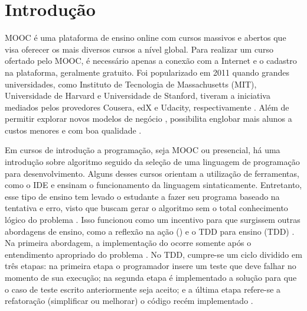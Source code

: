 \chapter{Introdução}

	\ac{MOOC} é uma plataforma de ensino online
	com cursos massivos e abertos que visa oferecer os mais diversos cursos a nível
	global. Para realizar um curso ofertado pelo \acs{MOOC}, é necessário apenas a conexão
	com a Internet e o cadastro na plataforma, geralmente gratuito. Foi popularizado
	em 2011 quando grandes universidades, como Instituto de Tecnologia de
	Massachusetts (MIT), Universidade de Harvard e Universidade de Stanford, tiveram
	a iniciativa mediados pelos provedores Cousera, edX e Udacity, respectivamente
	\cite{Mehlenbacher:2012}. Além de permitir explorar novos modelos de negócio
	\cite{dellarocas2013money}, possibilita englobar mais alunos a custos menores
	e com boa qualidade \cite{schmidt2013producing}.
	
	Em cursos de introdução a programação, seja \acs{MOOC} ou presencial, há uma introdução
	sobre algoritmo seguido da seleção de uma linguagem de programação para
	desenvolvimento. Alguns desses cursos orientam a utilização de ferramentas, como
	o \acs{IDE} e ensinam o funcionamento da linguagem sintaticamente.
	Entretanto, esse tipo de ensino tem levado o estudante a fazer seu programa baseado
	na tentativa e erro, visto que buscam gerar o algoritmo sem o total conhecimento
	lógico do problema \cite{edwards2003}. Isso funcionou como um incentivo para que
	surgissem outras abordagens de ensino, como a reflexão na ação () e o \acf{TDD} para ensino (\acs{TDD}) \cite{camara_graciottoSilva2016}. Na primeira abordagem, a
	implementação do  ocorre somente após o entendimento apropriado
	do problema \cite{edwards2004}. No \acs{TDD}, cumpre-se um ciclo dividido em três etapas:
	na primeira etapa o programador insere um teste que deve falhar no momento de sua
	execução; na segunda etapa é implementado a solução para que o caso de teste
	escrito anteriormente seja aceito; e a última etapa refere-se a refatoração
	(simplificar ou melhorar) o código recém implementado \cite{beck2003}.
	
	
